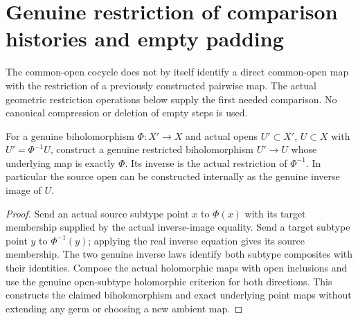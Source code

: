 \section{Genuine restriction of comparison histories and empty padding}

The common-open cocycle does not by itself identify a direct common-open map
with the restriction of a previously constructed pairwise map. The actual
geometric restriction operations below supply the first needed comparison.
No canonical compression or deletion of empty steps is used.

\begin{lemma}
\label{hir:sharp-actual-comparison-open-biholomorphism}
\leanok
For a genuine biholomorphism $\Phi:X'\to X$ and actual opens $U'\subset X'$,
$U\subset X$ with $U'=\Phi^{-1}U$, construct a genuine restricted
biholomorphism $U'\to U$ whose underlying map is exactly $\Phi$.
Its inverse is the actual restriction of $\Phi^{-1}$. In particular the
source open can be constructed internally as the genuine inverse image of $U$.
\end{lemma}
\begin{proof}
Send an actual source subtype point $x$ to $\Phi(x)$ with its target membership
supplied by the actual inverse-image equality. Send a target subtype point
$y$ to $\Phi^{-1}(y)$; applying the real inverse equation gives its source
membership. The two genuine inverse laws identify both subtype composites
with their identities. Compose the actual holomorphic maps with open
inclusions and use the genuine open-subtype holomorphic criterion for both
directions. This constructs the claimed biholomorphism and exact underlying
point maps without extending any germ or choosing a new ambient map.
\end{proof}

